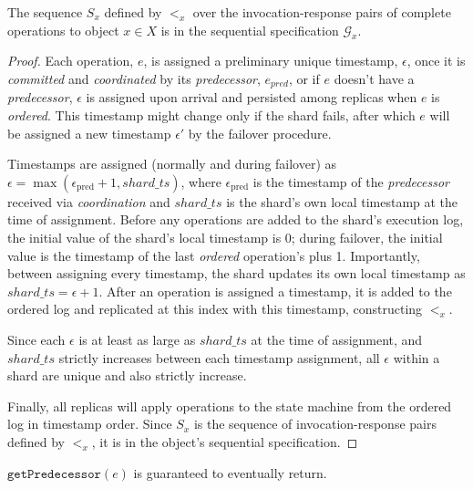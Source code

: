 \begin{lem}
    \label{lemmaD8}
    The sequence $S_x$ defined by $<_x$ over the invocation-response pairs of complete operations to object $x \in X$ is in the sequential specification $\mathcal{G}_x$.
\end{lem}
\begin{proof}
    Each operation, $e$, is assigned a preliminary unique timestamp, $\epsilon$, once it is \textit{committed} and \textit{coordinated} by its \textit{predecessor}, $e_{pred}$, or if $e$ doesn't have a \textit{predecessor}, $\epsilon$ is assigned upon arrival and persisted among replicas when $e$ is \textit{ordered}. This timestamp might change only if the shard fails, after which $e$ will be assigned a new timestamp $\epsilon'$ by the failover procedure.
    
    Timestamps are assigned (normally and during failover) as $\epsilon = \max(\epsilon_\text{pred}+1, shard\_ts)$, where $\epsilon_\text{pred}$ is the timestamp of the \textit{predecessor} received via \textit{coordination} and $shard\_ts$ is the shard's own local timestamp at the time of assignment. Before any operations are added to the shard's execution log, the initial value of the shard's local timestamp is $0$; during failover, the initial value is the timestamp of the last \textit{ordered} operation's plus 1. Importantly, between assigning every timestamp, the shard updates its own local timestamp as $shard\_ts = \epsilon + 1$. After an operation is assigned a timestamp, it is added to the ordered log and replicated at this index with this timestamp, constructing $<_x$.

    Since each $\epsilon$ is at least as large as $shard\_ts$ at the time of assignment, and $shard\_ts$ strictly increases between each timestamp assignment, all $\epsilon$ within a shard are unique and also strictly increase.

    Finally, all replicas will apply operations to the state machine from the ordered log in timestamp order. Since $S_x$ is the sequence of invocation-response pairs defined by $<_x$, it is in the object's sequential specification.
\end{proof}

\begin{lem}
    \label{lemmagetpred}
    $\texttt{getPredecessor}(e)$ is guaranteed to eventually return.
\end{lem}

